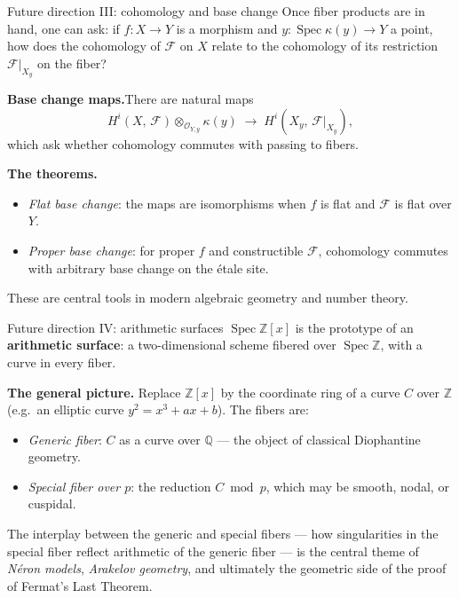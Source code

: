\documentclass[aspectratio=169,12pt]{beamer}
\begin{document}
\begin{frame}{Future direction III: cohomology and base change}
  Once fiber products are in hand, one can ask:
  if $f : X \to Y$ is a morphism and $y : \operatorname{Spec}\kappa(y) \to Y$
  a point, how does the cohomology of $\mathcal{F}$ on $X$ relate to the
  cohomology of its restriction $\mathcal{F}|_{X_y}$ on the fiber?

  \medskip

  \textbf{Base change maps.}\enspace There are natural maps
  \[
    H^i(X,\,\mathcal{F}) \otimes_{\mathcal{O}_{Y,y}} \kappa(y)
    \;\longrightarrow\;
    H^i(X_y,\,\mathcal{F}|_{X_y}),
  \]
  which ask whether cohomology commutes with passing to fibers.

  \medskip

  \textbf{The theorems.}
  \begin{itemize}
    \item \emph{Flat base change}: the maps are isomorphisms when
          $f$ is flat and $\mathcal{F}$ is flat over $Y$.
    \item \emph{Proper base change}: for proper $f$ and constructible
          $\mathcal{F}$, cohomology commutes with arbitrary base change
          on the \'etale site.
  \end{itemize}
  These are central tools in modern algebraic geometry and number theory.
\end{frame}

\begin{frame}{Future direction IV: arithmetic surfaces}
  $\operatorname{Spec}\mathbb{Z}[x]$ is the prototype of an
  \textbf{arithmetic surface}: a two-dimensional scheme fibered over
  $\operatorname{Spec}\mathbb{Z}$, with a curve in every fiber.

  \medskip

  \textbf{The general picture.}\enspace
  Replace $\mathbb{Z}[x]$ by the coordinate ring of a curve $C$ over $\mathbb{Z}$
  (e.g.\ an elliptic curve $y^2 = x^3 + ax + b$).
  The fibers are:
  \begin{itemize}
    \item \emph{Generic fiber}: $C$ as a curve over $\mathbb{Q}$ —
          the object of classical Diophantine geometry.
    \item \emph{Special fiber over $p$}: the reduction $C \bmod p$,
          which may be smooth, nodal, or cuspidal.
  \end{itemize}

  \medskip

  The interplay between the generic and special fibers —
  how singularities in the special fiber reflect arithmetic of the
  generic fiber — is the central theme of
  \emph{N\'eron models}, \emph{Arakelov geometry}, and ultimately the
  geometric side of the proof of Fermat's Last Theorem.
\end{frame}
\end{document}
